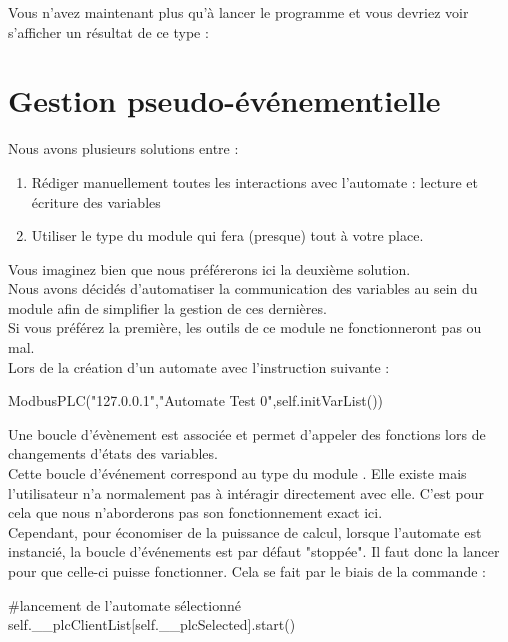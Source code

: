 Vous n'avez maintenant plus qu'à lancer le programme
et vous devriez voir s'afficher un résultat de ce type :




\section{Gestion pseudo-événementielle}

Nous avons plusieurs solutions entre : 
\begin{enumerate}
\item Rédiger manuellement toutes les interactions avec l'automate : lecture et écriture des variables
\item Utiliser le type  du module  qui fera (presque) tout à votre place.
\end{enumerate}
Vous imaginez bien que nous préférerons ici la deuxième solution.\\
Nous avons décidés d'automatiser la communication des variables au sein du module 
 afin de simplifier la gestion de ces dernières. \\
Si vous préférez la première, les outils de ce module ne fonctionneront pas ou mal.\\

Lors de la création d'un automate avec l'instruction suivante :
\begin{Python}
ModbusPLC("127.0.0.1","Automate Test 0",self.initVarList())
\end{Python}
Une boucle d'évènement est associée et permet d'appeler des fonctions lors de changements d'états des variables. \\
Cette boucle d'événement correspond au type  du module . Elle existe mais l'utilisateur n'a normalement pas à intéragir directement avec elle. C'est pour cela que nous n'aborderons pas son fonctionnement exact ici.\\

Cependant, pour économiser de la puissance de calcul, lorsque l'automate est instancié, la boucle d'événements est par défaut "stoppée". Il faut donc la lancer pour que celle-ci puisse fonctionner. Cela se fait par le biais de la commande :
\begin{Python}
	#lancement de l'automate sélectionné
	self.__plcClientList[self.__plcSelected].start()
\end{Python}

